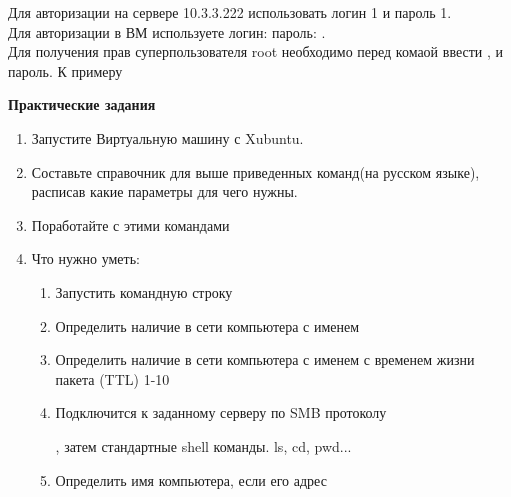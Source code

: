 \documentclass[a4paper,12pt]{article}
\begin{document}
  \begin{flushleft}
   Для авторизации на сервере 10.3.3.222 использовать логин 1 и пароль 1. \\[0.5em]
   Для авторизации в ВМ используете логин:  пароль: . \\[0.5em]
   Для получения прав суперпользователя root необходимо перед комаой ввести , и пароль. К примеру 
  \end{flushleft}


  \newpage

  \begin{center}
    {\bf Практические задания}
  \end{center}

  \begin{flushleft}
    \begin{enumerate} [1. ]
     \item Запустите Виртуальную машину с Xubuntu.
     \item Составьте справочник для выше приведенных команд(на русском языке), расписав какие параметры для чего нужны.
     \item Поработайте с этими командами
     \item Что нужно уметь:
      \begin{enumerate} [\bf a. ]
        \item Запустить командную строку
        \item Определить наличие в сети компьютера с именем 
        \begin{flushleft}
        \end{flushleft}
        \item Определить наличие в сети компьютера с именем  с временем жизни пакета (TTL) 1-10
        \begin{flushleft}
        \end{flushleft}
        \item Подключится к заданному серверу  по SMB протоколу
        \begin{flushleft}
          , затем стандартные shell команды. ls, cd, pwd...
        \end{flushleft}
        \item Определить имя компьютера, если его адрес 
        \begin{flushleft}

\end{flushleft}
\end{enumerate}
\end{enumerate}
\end{flushleft}
\end{document}

